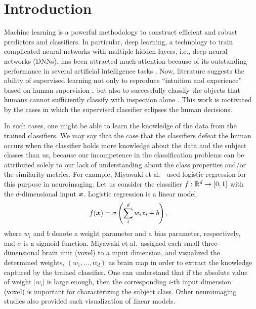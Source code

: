\section{Introduction}
%
Machine learning is a powerful methodology to construct efficient and robust
predictors and classifiers.
%
In particular, deep learning, a technology to train complicated neural
networks with multiple hidden layers, i.e., deep neural networks (DNNs),
has been attracted much attention because of its outstanding performance in
several artificial intelligence tasks \cite{krizhevsky2012imagenet,seide2011conversational,DeepFace}.
%
Now, literature suggests the ability of supervised learning not only to reproduce
``intuition and experience'' based on human supervision \cite{DeepFace},
but also to successfully classify the objects that humans cannot
sufficiently classify with inspection alone \cite{Horikawa2013,Mural1991}.
%
This work is motivated by the cases in which the supervised
classifier eclipses the human decisions.

%
In such cases, one might be able to learn the knowledge of the data from
the trained classifiers.
%
We may say that the case that the classifiers defeat the human
occurs when the classifier holds more knowledge about the
data and the subject classes than us, because our incompetence in the classification problems
can be attributed solely to our lack of understanding about the class
properties and/or the similarity metrics.
%
For example, Miyawaki et al.\ \cite{miyawaki2008visual} used
logistic regression for this purpose in neuroimaging.
%
Let us consider the classifier $f:\mathbb{R}^{d} \rightarrow [0, 1]$ with the
$d$-dimensional input $\mbox{\boldmath $x$}$.
Logistic regression is a linear model
\begin{equation}
 f(\mbox{\boldmath $x$}) = \sigma \left(\sum_{i}^{d} w_i x_i + b\right),
\end{equation}
where $w_i$ and $b$ denote a
weight parameter and a bias parameter, respectively, and $\sigma$ is a sigmoid function.
%
Miyawaki et al.\ assigned each small three-dimensional brain unit
(voxel) to a input dimension,
and visualized the determined weights, $(w_1, \dots, w_d)$
as brain map in order to extract the knowledge captured by the trained classifier.
%
One can understand that if the absolute value of weight $|w_i|$ is large enough, then the
corresponding $i$-th input dimension (voxel) is important for characterizing the
subject class.
%
Other neuroimaging studies \cite{LaConte2005,yamashita2008sparse,abraham2014machine} also
provided such visualization of linear models.

